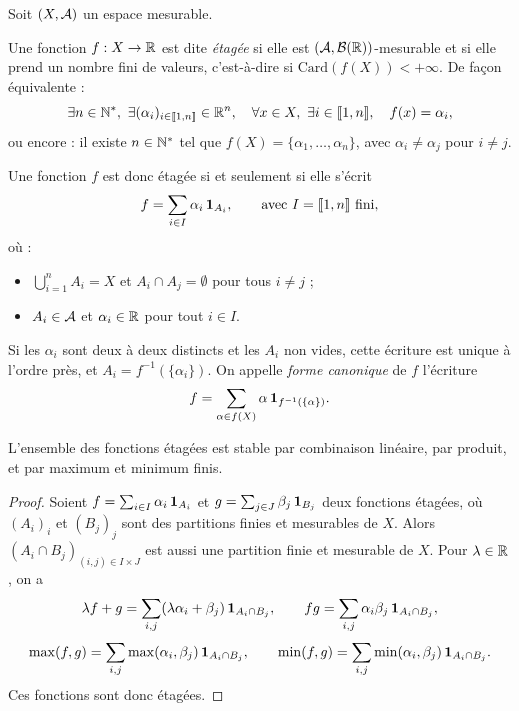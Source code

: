 \documentclass[11pt]{article}
\begin{document}
Soit $(X,\mathcal{A})$ un espace mesurable.

\begin{definition}
Une fonction $f : X \to \mathbb{R}$ est dite \emph{étagée} si elle est $(\mathcal{A},\mathcal{B}(\mathbb{R}))$-mesurable et si elle prend un nombre fini de valeurs, c'est-à-dire si $\mathrm{Card}(f(X)) < +\infty$. De façon équivalente :
\[
  \exists n \in \N^*,\ \exists (\alpha_i)_{i\in\llbracket 1,n\rrbracket} \in \R^n,\quad \forall x \in X,\ \exists i \in \llbracket 1,n\rrbracket,\quad f(x) = \alpha_i,
\]
ou encore : il existe $n \in \mathbb{N}^*$ tel que $f(X) = \{\alpha_1,\dots,\alpha_n\}$, avec $\alpha_i \neq \alpha_j$ pour $i \neq j$.
\end{definition}

Une fonction $f$ est donc étagée si et seulement si elle s'écrit
\[
  f = \sum_{i\in I}\alpha_i\,\mathbf{1}_{A_i},
  \qquad\text{avec } I = \llbracket 1,n\rrbracket \text{ fini},
\]
où :
\begin{itemize}
  \item $\displaystyle\bigcup_{i=1}^{n} A_i = X$ et $A_i \cap A_j = \emptyset$ pour tous $i \neq j$ ;
  \item $A_i \in \mathcal{A}$ et $\alpha_i \in \mathbb{R}$ pour tout $i \in I$.
\end{itemize}
Si les $\alpha_i$ sont deux à deux distincts et les $A_i$ non vides, cette écriture est unique à l'ordre près, et $A_i = f^{-1}(\{\alpha_i\})$. On appelle \emph{forme canonique} de $f$ l'écriture
\[
  f = \sum_{\alpha \in f(X)} \alpha\,\mathbf{1}_{f^{-1}(\{\alpha\})}.
\]

\begin{proposition}\label{prop:etagees}
L'ensemble des fonctions étagées est stable par combinaison linéaire, par produit, et par maximum et minimum finis.
\end{proposition}

\begin{proof}
Soient $f = \sum_{i\in I} \alpha_i\,\mathbf{1}_{A_i}$ et $g = \sum_{j\in J}\beta_j\,\mathbf{1}_{B_j}$ deux fonctions étagées, où $(A_i)_i$ et $(B_j)_j$ sont des partitions finies et mesurables de $X$. Alors $(A_i\cap B_j)_{(i,j)\in I\times J}$ est aussi une partition finie et mesurable de $X$. Pour $\lambda \in \mathbb{R}$, on a
\[
  \lambda f + g = \sum_{i,j} (\lambda\alpha_i+\beta_j)\,\mathbf{1}_{A_i\cap B_j},
  \qquad
  fg = \sum_{i,j} \alpha_i\beta_j\,\mathbf{1}_{A_i\cap B_j},
\]
\[
  \max(f,g) = \sum_{i,j} \max(\alpha_i,\beta_j)\,\mathbf{1}_{A_i\cap B_j},
  \qquad
  \min(f,g) = \sum_{i,j} \min(\alpha_i,\beta_j)\,\mathbf{1}_{A_i\cap B_j}.
\]
Ces fonctions sont donc étagées.
\end{proof}
\end{document}

